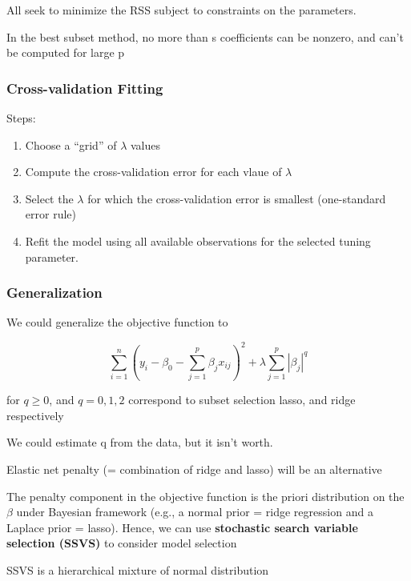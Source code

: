 \documentclass[
]{book}
\providecommand{\tightlist}{%
  \setlength{\itemsep}{0pt}\setlength{\parskip}{0pt}}
\begin{document}
All seek to minimize the RSS subject to constraints on the parameters.

In the best subset method, no more than s coefficients can be nonzero, and can't be computed for large p

\hypertarget{cross-validation-fitting}{%
\subsubsection{Cross-validation Fitting}\label{cross-validation-fitting}}

Steps:

\begin{enumerate}
\def\labelenumi{\arabic{enumi}.}
\tightlist
\item
  Choose a ``grid'' of \(\lambda\) values
\item
  Compute the cross-validation error for each vlaue of \(\lambda\)
\item
  Select the \(\lambda\) for which the cross-validation error is smallest (one-standard error rule)
\item
  Refit the model using all available observations for the selected tuning parameter.
\end{enumerate}

\hypertarget{generalization}{%
\subsubsection{Generalization}\label{generalization}}

We could generalize the objective function to

\[
\sum_{i=1}^n (y_i - \beta_0- \sum_{j=1}^p \beta_j x_{ij})^2 + \lambda \sum_{j=1}^p |\beta_j|^q
\]

for \(q \ge 0\), and \(q =0,1,2\) correspond to subset selection lasso, and ridge respectively

We could estimate q from the data, but it isn't worth.

Elastic net penalty (= combination of ridge and lasso) will be an alternative

The penalty component in the objective function is the priori distribution on the \(\beta\) under Bayesian framework (e.g., a normal prior = ridge regression and a Laplace prior = lasso). Hence, we can use \textbf{stochastic search variable selection (SSVS)} to consider model selection \citet{george1993}

SSVS is a hierarchical mixture of normal distribution
\end{document}
